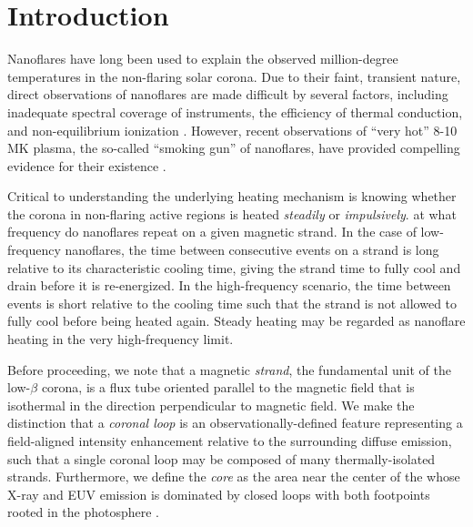 \section{Introduction}\label{introduction}

Nanoflares have long been used to explain the observed million-degree temperatures in the non-flaring solar corona.  Due to their faint, transient nature, direct observations of nanoflares are made difficult by several factors, including inadequate spectral coverage of instruments, the efficiency of thermal conduction, and non-equilibrium ionization \citep{cargill_implications_1994,winebarger_defining_2012,barnes_inference_2016}. However, recent observations of ``very hot'' 8-10 MK plasma, the so-called ``smoking gun'' of nanoflares, have provided compelling evidence for their existence \citep[e.g.][]{brosius_pervasive_2014,caspi_new_2015,parenti_spectroscopy_2017,ishikawa_detection_2017}.

Critical to understanding the underlying heating mechanism is knowing whether the corona in non-flaring active regions is heated \textit{steadily} or \textit{impulsively}.  at what frequency do nanoflares repeat on a given magnetic strand. In the case of low-frequency nanoflares, the time between consecutive events on a strand is long relative to its characteristic cooling time, giving the strand time to fully cool and drain before it is re-energized. In the high-frequency scenario, the time between events is short relative to the cooling time such that the strand is not allowed to fully cool before being heated again. Steady heating may be regarded as nanoflare heating in the very high-frequency limit. 

Before proceeding, we note that a magnetic \textit{strand}, the fundamental unit of the low-$\beta$ corona, is a flux tube oriented parallel to the magnetic field that is isothermal in the direction perpendicular to magnetic field. We make the distinction that a \textit{coronal loop} is an observationally-defined feature representing a field-aligned intensity enhancement relative to the surrounding diffuse emission, such that a single coronal loop may be composed of many thermally-isolated strands. Furthermore, we define the \AR{} \textit{core} as the area near the center of the \AR{} whose X-ray and EUV emission is dominated by closed loops with both footpoints rooted in the photosphere .

